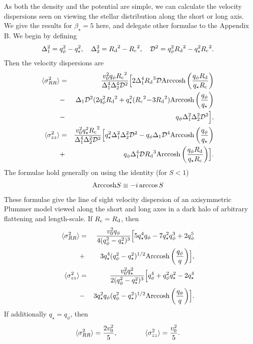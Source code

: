 \documentclass[prd,twocolumn,showpacs,preprintnumbers,superscriptaddress,nofootinbib,amsmath,amssymb,nobalancelastpage]{revtex4}
\def\arccosh{{\rm Arccosh}}
\def\Rd{{R_{\rm d}}}
\def\Rc{{R_{\rm c}}}
\begin{document}
As both the density and the potential are simple, we can calculate the
velocity dispersions seen on viewing the stellar distribution along
the short or long axis. We give the results for $\beta_\star =5$ here,
and delegate other formulae to the Appendix B. We begin by defining
%
\begin{equation}
\Delta_1^2 = q_\phi^2 -q_\star^2,\quad \Delta_2^2 = \Rd^2-\Rc^2,\quad
\mathcal{D}^2 = q_\phi^2\Rd^2 - q_\star^2\Rc^2.
\end{equation}
%
Then the velocity dispersions are
%
\begin{eqnarray}
\langle\sigma^2_{RR}\rangle &=&  {v_0^2 q_\phi \Rc^2 \over
  \Delta_1^4\Delta_2^4\mathcal{D}^2} \Bigl[
2 \Delta_1^4 \Rd^3 \mathcal{D}\arccosh \left({q_\phi\Rd\over
  q_\star\Rc}\right) \nonumber \\
&-&\Delta_1 \mathcal{D}^2(2q_\phi^2\Rd^2 + q_\star^2(\Rc^2\!-\!3\Rd^2)
\arccosh
\left({q_\phi\over q_\star}\right) \nonumber\\
&-& q_\phi \Delta_1^2\Delta_2^2\mathcal{D}^2\Bigr],\nonumber\\
\langle\sigma^2_{zz}\rangle &=&
{v_0^2 q_\star^2 \Rc^2 \over \Delta_1^4 \Delta_2^2 \mathcal{D}^2} \Bigl[
q_\star^2\Delta_1^2 \Delta_2^2 \mathcal{D}^2 - q_\phi\Delta_1 \mathcal{D}^4
\arccosh
\left({q_\phi\over q_\star}\right) \nonumber \\
&+& q_\phi\Delta_1^4 \mathcal{D} \Rd^3 \arccosh \left({q_\phi\Rd\over q_\star\Rc}\right)\Bigr].
\end{eqnarray}
%
The formulae hold generally on using the identity (for $S<1$)
%
\[
\arccosh S \equiv -i \arccos S
\]
%
These formulae give the line of sight velocity dispersion of an
axisymmetric Plummer model viewed along the short and long axes in a
dark halo of arbitrary flattening and length-scale.
If $\Rc = \Rd$, then
%
\begin{eqnarray}
\langle\sigma^2_{RR}\rangle &=& {v_0^2q_\phi \over 4(q_\phi^2-q_\star^2)^3}\Bigl[ 5q_\star^4q_\phi -7q_\star^2q_\phi^3
+ 2q_\phi^5 \nonumber\\
&+& 3q_\star^4(q_\phi^2-q_\star^2)^{1/2}\arccosh\left({q_\phi\over q}\right)\Bigr],
\nonumber \\
\langle\sigma^2_{zz}\rangle &=& {v_0^2q_\star^2 \over
  2(q_\phi^2-q_\star^2)^3}\Bigl[q_\phi^4 + q_\phi^2q_\star^2 - 2q_\star^4 \nonumber\\
&-& 3 q_\star^2q_\phi(q_\phi^2-q_\star^2)^{1/2}\arccosh\left({q_\phi\over q}\right)\Bigr].
\end{eqnarray}
%
If additionally $q_\star = q_\phi$, then
%
\begin{equation}
\langle\sigma^2_{RR}\rangle = {2v_0^2 \over 5},\qquad\qquad
\langle\sigma^2_{zz}\rangle = {v_0^2\over 5}.
\end{equation}
\end{document}
